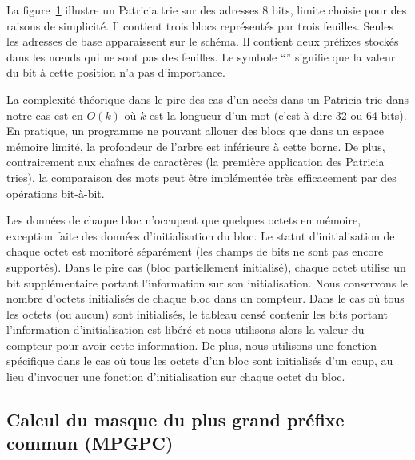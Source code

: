 La figure~\ref{fig:insertion-Patricia-trie-0} illustre un Patricia
trie sur des adresses 8 bits, limite choisie pour des raisons de simplicité.
Il contient trois blocs représentés par trois feuilles.
Seules les adresses de base apparaissent sur le schéma.
Il contient deux préfixes stockés dans les n\oe{}uds qui ne sont pas des
feuilles.
Le symbole ``{\tt *}'' signifie que la valeur du bit à cette position n'a pas
d'importance.

\begin{figure}[h]
  
  \label{fig:insertion-Patricia-trie-0}
\end{figure}

La complexité théorique dans le pire des cas d'un accès dans un Patricia trie
dans notre cas est en $O(k)$ où $k$ est la longueur d'un mot (c'est-à-dire
32 ou 64 bits).
En pratique, un programme ne pouvant allouer des blocs que dans un
espace mémoire limité, la profondeur de l'arbre est inférieure à cette borne.
De plus, contrairement aux chaînes de caractères (la première application des
Patricia tries), la comparaison des mots peut être implémentée très
efficacement par des opérations bit-à-bit.

Les données de chaque bloc n'occupent que quelques octets en mémoire, exception
faite des données d'initialisation du bloc.
Le statut d'initialisation de chaque octet est monitoré séparément (les champs
de bits ne sont pas encore supportés).
Dans le pire cas (bloc partiellement initialisé), chaque octet utilise un bit
supplémentaire portant l'information sur son initialisation.
Nous conservons le nombre d'octets initialisés de chaque bloc dans un
compteur.
Dans le cas où tous les octets (ou aucun) sont initialisés, le tableau censé
contenir les bits portant l'information d'initialisation est libéré et nous
utilisons alors la valeur du compteur pour avoir cette information.
De plus, nous utilisons une fonction spécifique dans le cas où tous les octets
d'un bloc sont initialisés d'un coup, au lieu d'invoquer une fonction
d'initialisation sur chaque octet du bloc.


\subsection{Calcul du masque du plus grand préfixe commun (MPGPC)}


%

